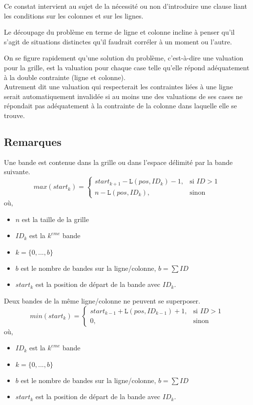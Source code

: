 \documentclass[a4paper,12pt]{report}
\begin{document}
Ce constat intervient au sujet de la nécessité ou non d'introduire une clause liant les conditions sur les colonnes et sur les lignes.

Le découpage du problème en terme de ligne et colonne incline à penser qu'il s'agit de situations distinctes qu'il faudrait corréler à un moment ou l'autre.

On se figure rapidement qu'une solution du problème, c'est-à-dire une valuation pour la grille, est la valuation pour chaque case telle qu'elle répond adéquatement à la double contrainte (ligne et colonne).\\

Autrement dit une valuation qui respecterait les contraintes liées à une ligne serait automatiquement invalidée si au moins une des valuations de ses cases ne répondait pas adéquatement à la contrainte de la colonne dans laquelle elle se trouve.\\


\subsection{Remarques}

Une bande est contenue dans la grille ou dans l'espace délimité par la bande suivante.
	$$max(start_k) =
	\begin{cases} 
		 start_{k+1}-\mathtt{L}(pos,ID_k)-1, &\text{si } ID > 1\\
		 n - \mathtt{L}(pos,ID_k), & \text{sinon}
	\end{cases}
	$$
	où,
		\begin{itemize}
		\item[] $n$ est la taille de la grille
		\item[] $ID_k$ est la $k^{eme}$ bande
		\item[] $k=\{0,...,b\}$
		\item[] $b$ est le nombre de bandes sur la ligne/colonne, $b=\sum ID$		
		\item[] $start_k$ est la position de départ de la bande avec $ID_k$.\\
		\end{itemize}

Deux bandes de la même ligne/colonne ne peuvent se superposer.
$$ min(start_k) = 
	\begin{cases} 
		start_{k-1}+\mathtt{L}(pos,ID_{k-1})+1, &\text{si } ID > 1 \\
		0, & \text{sinon} 
	\end{cases}
$$
où,
		\begin{itemize}
		\item[] $ID_k$ est la $k^{eme}$ bande
		\item[] $k=\{0,...,b\}$
		\item[] $b$ est le nombre de bandes sur la ligne/colonne, $b=\sum ID$	
		\item[] $start_k$ est la position de départ de la bande avec $ID_k$.
		\end{itemize}
\end{document}
